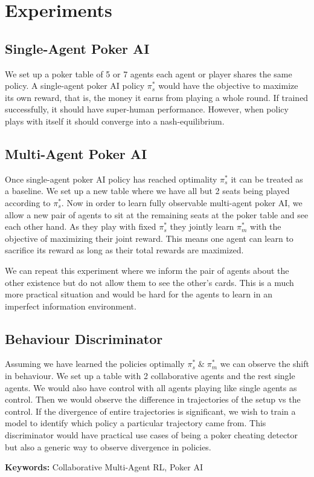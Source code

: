 \documentclass[10pt]{article}
\begin{document}
\section{Experiments}

\subsection{Single-Agent Poker AI}
We set up a poker table of 5 or 7 agents each agent or player shares the same policy. 
A single-agent poker AI policy $\pi_s^*$ would have the objective to maximize its own reward, that is, the money it earns from playing a whole round. If trained successfully, it should have super-human performance. However, when policy plays with itself it should converge into a nash-equilibrium. 

\subsection{Multi-Agent Poker AI}

Once single-agent poker AI policy has reached optimality $\pi_s^*$ it can be treated as a baseline. We set up a new table where we have all but 2 seats being played according to $\pi_s^*$. Now in order to learn fully observable multi-agent poker AI, we allow a new pair of agents to sit at the remaining seats at the poker table and see each other hand. As they play with fixed $\pi_s^*$ they jointly learn $\pi_m^*$ with the objective of maximizing their joint reward. This means one agent can learn to sacrifice its reward as long as their total rewards are maximized. 

We can repeat this experiment where we inform the pair of agents about the other existence but do not allow them to see the other's cards. This is a much more practical situation and would be hard for the agents to learn in an imperfect information environment.

\subsection{Behaviour Discriminator}

Assuming we have learned the policies optimally $\pi_s^* \; \& \; \pi_m^*$ we can observe the shift in behaviour. We set up a table with 2 collaborative agents and the rest single agents. We would also have control with all agents playing like single agents as control. Then we would observe the difference in trajectories of the setup vs the control. If the divergence of entire trajectories is significant, we wish to train a model to identify which policy a particular trajectory came from. This discriminator would have practical use cases of being a poker cheating detector but also a generic way to observe divergence in policies.





{\bf Keywords:} Collaborative Multi-Agent RL, Poker AI
\end{document}
